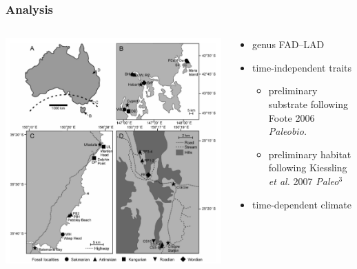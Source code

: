 \documentclass{beamer}
\begin{document}
\begin{frame}
  \frametitle{Analysis}

  \begin{columns}
    \begin{column}{0.5\textwidth}
      \begin{center}
        \includegraphics[height = 0.8\textheight, width = \textwidth, keepaspectratio = true]{figure/australia}

        \tiny{}
      \end{center}
    \end{column}
    \begin{column}{0.5\textwidth}
      \begin{itemize}
        \item genus FAD--LAD
        \item time-independent traits
          \begin{itemize}
            \item preliminary substrate following Foote 2006 \textit{Paleobio.}
            \item preliminary habitat following Kiessling \textit{et al.} 2007 \textit{Paleo\(^3\)}
          \end{itemize}
        \item time-dependent climate 
      \end{itemize}
    \end{column}
  \end{columns}
\end{frame}
\end{document}
